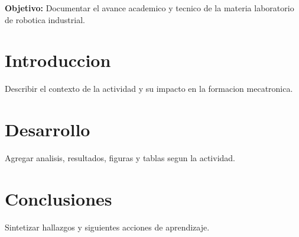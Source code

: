 \documentclass[spanish,letterpaper,oneside]{article}
\begin{document}
\templatePortrait
\templatePagecfg
\onehalfspacing

\begin{abstractd}
\textbf{Objetivo:} Documentar el avance academico y tecnico de la materia laboratorio de robotica industrial.
\end{abstractd}

\templateIndex
\templateFinalcfg

\section{Introduccion}
Describir el contexto de la actividad y su impacto en la formacion mecatronica.

\section{Desarrollo}
Agregar analisis, resultados, figuras y tablas segun la actividad.

\section{Conclusiones}
Sintetizar hallazgos y siguientes acciones de aprendizaje.



\end{document}
